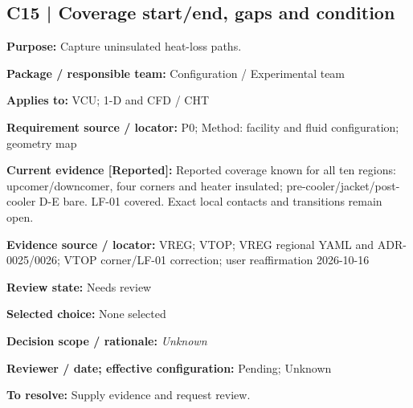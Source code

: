 \documentclass[11pt]{article}
\begin{document}
\par\noindent\begin{minipage}{\textwidth}\small\setlength{\parskip}{2pt}
\subsection*{C15 | Coverage start/end, gaps and condition}
\textbf{Purpose:} Capture uninsulated heat-loss paths.\par
\textbf{Package / responsible team:} Configuration / Experimental team\par
\textbf{Applies to:} VCU; 1-D and CFD / CHT\par
\textbf{Requirement source / locator:} P0; Method: facility and fluid configuration; geometry map\par
\textbf{Current evidence [Reported]:} Reported coverage known for all ten regions: upcomer/downcomer, four corners and heater insulated; pre-cooler/jacket/post-cooler D-E bare. LF-01 covered. Exact local contacts and transitions remain open.\par
\textbf{Evidence source / locator:} VREG; VTOP; VREG regional YAML and ADR-0025/0026; VTOP corner/LF-01 correction; user reaffirmation 2026-10-16\par
\textbf{Review state:} Needs review\par
\textbf{Selected choice:} None selected\par
\textbf{Decision scope / rationale:} \textit{Unknown}\par
\textbf{Reviewer / date; effective configuration:} Pending; Unknown\par
\textbf{To resolve:} Supply evidence and request review.\par
\end{minipage}\par\vspace{5pt}
\end{document}
